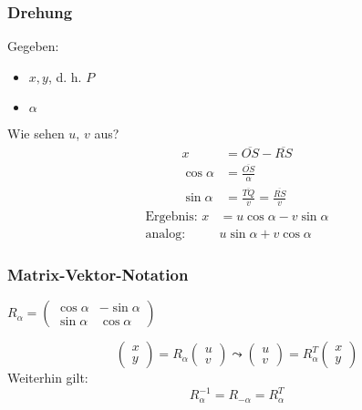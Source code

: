 \subsubsection*{Drehung}


Gegeben:
\begin{itemize}
	\item $x, y$, d. h. $P$
	\item $\alpha$
\end{itemize}
%
Wie sehen $u$, $v$ aus?
%
\begin{align*}
x &= \overline{OS} - \overline{RS} \\
\cos \alpha &= \frac{\overline{OS}}{\alpha} \\
\sin \alpha &= \frac{\overline{TQ}}{v} = \frac{\overline{RS}}{v}
\end{align*}
%
\begin{align*}
\text{Ergebnis: } x &= u \cos \alpha - v \sin \alpha \\
\text{analog: } &u \sin \alpha + v \cos \alpha
\end{align*}

\subsubsection*{Matrix-Vektor-Notation}

\begin{definition}
	$ R_{\alpha} =
	\begin{pmatrix}
		\cos \alpha & -\sin \alpha \\
		\sin \alpha & \cos \alpha
 	\end{pmatrix}$
\end{definition}

\begin{equation*}
	\begin{pmatrix}
		x \\
		y
 	\end{pmatrix} = R_{\alpha} 
 	\begin{pmatrix}
		u \\
		v
 	\end{pmatrix}
 	\leadsto
 		\begin{pmatrix}
		u \\
		v
 	\end{pmatrix} = R_{\alpha}^{T}
 	\begin{pmatrix}
		x \\
		y
 	\end{pmatrix}
\end{equation*}
%
Weiterhin gilt:
\begin{equation*}
	R_{\alpha}^{-1} = R_{-\alpha} = R_{\alpha}^{T}
\end{equation*}

